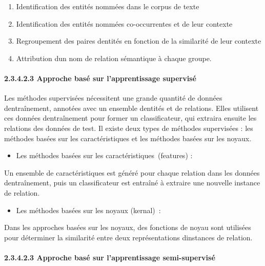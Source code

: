 \documentclass[
]{article}
\begin{document}
\begin{enumerate}
\def\labelenumi{\arabic{enumi}.}
\item
  Identification des entités nommées dans le corpus de texte
\item
  Identification des entités nommées co-occurrentes et de leur contexte
\item
  Regroupement des paires d\textquotesingle entités en fonction de la
  similarité de leur contexte
\item
  Attribution d\textquotesingle un nom de relation sémantique à chaque
  groupe.
\end{enumerate}

\paragraph{\texorpdfstring{2.3.4.2.3 Approche basé sur l'apprentissage
supervisé
}{2.3.4.2.3 Approche basé sur l'apprentissage supervisé }}\label{approche-basuxe9-sur-lapprentissage-supervisuxe9}

Les méthodes supervisées nécessitent une grande quantité de données
d\textquotesingle entraînement, annotées avec un ensemble
d\textquotesingle entités et de relations. Elles utilisent ces données
d\textquotesingle entraînement pour former un classificateur, qui
extraira ensuite les relations des données de test. Il existe deux types
de méthodes supervisées : les méthodes basées sur les caractéristiques
et les méthodes basées sur les noyaux.

\begin{itemize}
\item
  Les méthodes basées sur les caractéristiques~(features) :
\end{itemize}

Un ensemble de caractéristiques est généré pour chaque relation dans les
données d\textquotesingle entraînement, puis un classificateur est
entraîné à extraire une nouvelle instance de relation.

\begin{itemize}
\item
  Les méthodes basées sur les noyaux (kernal)~:
\end{itemize}

Dans les approches basées sur les noyaux, des fonctions de noyau sont
utilisées pour déterminer la similarité entre deux représentations
d\textquotesingle instances de relation.

\paragraph{\texorpdfstring{2.3.4.2.3 Approche basé sur l'apprentissage
semi-supervisé
}{2.3.4.2.3 Approche basé sur l'apprentissage semi-supervisé }}\label{approche-basuxe9-sur-lapprentissage-semi-supervisuxe9}
\end{document}

